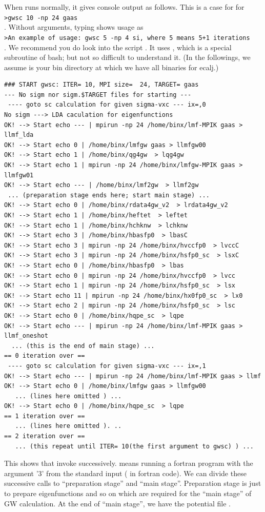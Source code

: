 When  runs normally, it gives console output as follows.
This is a case for  for\\
\verb#>gwsc 10 -np 24 gaas#\\
. Without arguments, typing  shows usage as \\
\verb#>An example of usage: gwsc 5 -np 4 si, where 5 means 5+1 iterations#\\
. We recommend you do look into the script . 
It uses , which is a special
subroutine of bash; but not so difficult to understand it.
(In the followings, we assume  is your bin directory 
at which we have all binaries for ecalj.)

{\baselineskip=2mm
\begin{verbatim}
### START gwsc: ITER= 10, MPI size=  24, TARGET= gaas
--- No sigm nor sigm.$TARGET files for starting ---
 ---- goto sc calculation for given sigma-vxc --- ix=,0
No sigm ---> LDA caculation for eigenfunctions 
OK! --> Start echo --- | mpirun -np 24 /home/binx/lmf-MPIK gaas > llmf_lda 
OK! --> Start echo 0 | /home/binx/lmfgw gaas > llmfgw00 
OK! --> Start echo 1 | /home/binx/qg4gw  > lqg4gw 
OK! --> Start echo 1 | mpirun -np 24 /home/binx/lmfgw-MPIK gaas > llmfgw01 
OK! --> Start echo --- | /home/binx/lmf2gw  > llmf2gw 
 ... (preparation stage ends here; start main stage) ...
OK! --> Start echo 0 | /home/binx/rdata4gw_v2  > lrdata4gw_v2 
OK! --> Start echo 1 | /home/binx/heftet  > leftet 
OK! --> Start echo 1 | /home/binx/hchknw  > lchknw 
OK! --> Start echo 3 | /home/binx/hbasfp0  > lbasC 
OK! --> Start echo 3 | mpirun -np 24 /home/binx/hvccfp0  > lvccC 
OK! --> Start echo 3 | mpirun -np 24 /home/binx/hsfp0_sc  > lsxC 
OK! --> Start echo 0 | /home/binx/hbasfp0  > lbas 
OK! --> Start echo 0 | mpirun -np 24 /home/binx/hvccfp0  > lvcc 
OK! --> Start echo 1 | mpirun -np 24 /home/binx/hsfp0_sc  > lsx 
OK! --> Start echo 11 | mpirun -np 24 /home/binx/hx0fp0_sc  > lx0 
OK! --> Start echo 2 | mpirun -np 24 /home/binx/hsfp0_sc  > lsc 
OK! --> Start echo 0 | /home/binx/hqpe_sc  > lqpe 
OK! --> Start echo --- | mpirun -np 24 /home/binx/lmf-MPIK gaas > llmf_oneshot 
  ... (this is the end of main stage) ...
== 0 iteration over ==
 ---- goto sc calculation for given sigma-vxc --- ix=,1
OK! --> Start echo --- | mpirun -np 24 /home/binx/lmf-MPIK gaas > llmf 
OK! --> Start echo 0 | /home/binx/lmfgw gaas > llmfgw00 
   ... (lines here omitted ) ...
OK! --> Start echo 0 | /home/binx/hqpe_sc  > lqpe 
== 1 iteration over ==
   ... (lines here omitted ). ..
== 2 iteration over ==
   ... (this repeat until ITER= 10(the first argument to gwsc) ) ...
\end{verbatim}
}
This shows that  invoke  successively.
 means running a fortran program  
with the argument '3' from the standard input ( in fortran
code).
We can divide these successive calls to ``preparation stage'' and ``main
stage''. Preparation stage is just to prepare eigenfunctions and so on 
which are required for the ``main stage'' of GW calculation.
At the end of ``main stage'', we have the potential file .

